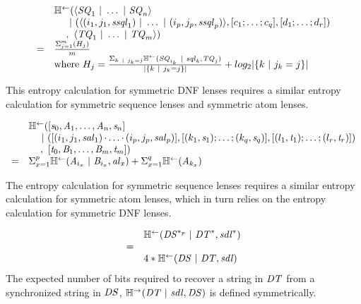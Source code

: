\documentclass[acmsmall,screen,anonymous]{acmart}
\begin{document}
\[
  \begin{array}{rl}
    & \mathbb{H}^\leftarrow(\langle\mathit{SQ}_1 ~|~ \ldots ~|~ \mathit{SQ}_n\rangle\\
    & \hspace*{1.21em}~|~
      (\langle(i_1,j_1,\mathit{ssql}_1)~|~
      \ldots~|~
      (i_p,j_p,\mathit{ssql}_p)\rangle
      ,[ c_1;\ldots;c_q ]
      ,[ d_1;\ldots;d_r ])\\
    & \hspace*{1.21em},~\langle\mathit{TQ}_1 ~|~ \ldots ~|~ \mathit{TQ}_m\rangle)\\
    = & \frac{\Sigma_{j=1}^m(H_j)}{m}\\
    & \text{where } H_j = \frac{\Sigma_{k~|~ j_k = j}
      \mathbb{H}^\leftarrow(\mathit{SQ}_{i_k}~|~\mathit{sql}_k,\mathit{TQ}_j)}{|\{k~|~
      j_k = j\}|} + log_2|\{k~|~ j_k = j\}|
  \end{array}
\]

This entropy calculation for symmetric DNF lenses requires a similar entropy
calculation for symmetric sequence lenses and symmetric atom lenses.

\[
  \begin{array}{rl}
      & \mathbb{H}^\leftarrow(
        [\mathit{s}_0,\mathit{A}_1,\ldots,\mathit{A}_n,\mathit{s}_n]\\
      & \hspace*{1em}~|~
        ([(i_1,j_1,\mathit{sal}_1)\mkern-1mu\cdot\mkern-1mu
        \ldots\mkern-1mu\cdot\mkern-1mu
        (i_p,j_p,\mathit{sal}_p)]
        ,[ (k_1,\mathit{s}_1);\ldots;(k_q,\mathit{s}_q) ]
        ,[ (l_1,\mathit{t}_1);\ldots;(l_r,\mathit{t}_r) ])\\
      & \hspace*{1.21em},~
        [\mathit{t}_0,\mathit{B}_1,\ldots,\mathit{B}_m,\mathit{t}_m])\\
      =
      & \Sigma_{x=1}^p\mathbb{H}^\leftarrow(\mathit{A}_{i_x} ~|~ \mathit{B}_{i_x},\mathit{al}_x) +
        \Sigma_{x=1}^q\mathbb{H}^\leftarrow(\mathit{A}_{k_x})
  \end{array}
\]

The entropy calculation for symmetric sequence lenses requires a similar entropy
calculation for symmetric atom lenses, which in turn relies on the entropy
calculation for symmetric DNF lenses.

\[\begin{array}{rl}
      & \mathbb{H}^\leftarrow(\mathit{DS}^{*_{p}} ~|~ {\mathit{DT}}^*,{\mathit{sdl}}^*)\\
      =\\
      & 4*\mathbb{H}^\leftarrow(\mathit{DS}~|~\mathit{DT},\mathit{sdl})
  \end{array}
\]
The expected number of bits required to recover a string in $\mathit{DT}$ from
a synchronized string in $\mathit{DS}$, $\mathbb{H}^\rightarrow(\mathit{DT} ~|~
  \mathit{sdl}, \mathit{DS})$ is defined symmetrically.
\end{document}
